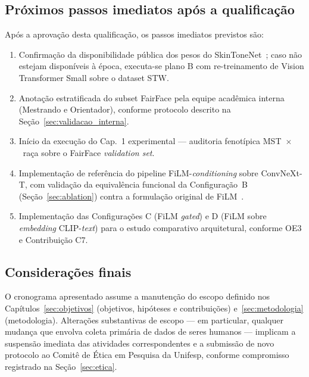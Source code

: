 \subsection{Próximos passos imediatos após a qualificação}
\label{sec:proximos}

Após a aprovação desta qualificação, os passos imediatos previstos são:

\begin{enumerate}
\item Confirmação da disponibilidade pública dos pesos do SkinToneNet~\autocite{matias2026large}; caso não estejam disponíveis à época, executa-se plano B com re-treinamento de Vision Transformer Small sobre o dataset STW.
\item Anotação estratificada do subset FairFace pela equipe acadêmica interna (Mestrando e Orientador), conforme protocolo descrito na Seção~\ref{sec:validacao_interna}.
\item Início da execução do Cap.~1 experimental --- auditoria fenotípica MST~$\times$~raça sobre o FairFace \emph{validation set}.
\item Implementação de referência do pipeline FiLM-\emph{conditioning} sobre ConvNeXt-T, com validação da equivalência funcional da Configuração~B (Seção~\ref{sec:ablation}) contra a formulação original de FiLM~\autocite{perez2018film}.
\item Implementação das Configurações C (FiLM \emph{gated}) e D (FiLM sobre \emph{embedding} CLIP-\emph{text}) para o estudo comparativo arquitetural, conforme OE3 e Contribuição C7.
\end{enumerate}

\subsection{Considerações finais}
\label{sec:cronograma_final}

O cronograma apresentado assume a manutenção do escopo definido nos Capítulos~\ref{sec:objetivos} (objetivos, hipóteses e contribuições) e~\ref{sec:metodologia} (metodologia). Alterações substantivas de escopo --- em particular, qualquer mudança que envolva coleta primária de dados de seres humanos --- implicam a suspensão imediata das atividades correspondentes e a submissão de novo protocolo ao Comitê de Ética em Pesquisa da Unifesp, conforme compromisso registrado na Seção~\ref{sec:etica}.
